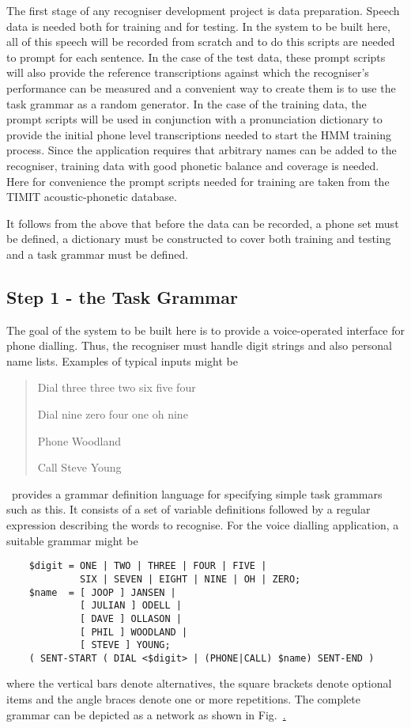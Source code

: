 The first stage of any recogniser development project is data preparation.
  Speech data is needed both for training and for
testing.  In the system to be built here, all of this speech will be recorded
from scratch and to do this scripts are needed to prompt for each sentence.  In
the case of the test data, these prompt scripts will also provide the reference
transcriptions against which the recogniser's performance can be measured and a
convenient way to create them is to use the task grammar as a random generator.
In the case of the training data, the prompt scripts will be used in
conjunction with a pronunciation dictionary to provide the initial phone level
transcriptions needed to start the HMM training process.  Since the application
requires that arbitrary names can be added to the recogniser, training data
with good phonetic balance and coverage is needed.  Here for convenience the
prompt scripts needed for training are taken from the TIMIT acoustic-phonetic
database.

It follows from the above that before the data can be recorded, a phone set
must be defined, a dictionary must be constructed to cover both training and
testing and a task grammar must be defined.

\subsection{Step 1 - the Task Grammar}

The goal of the system to be built here is to provide a voice-operated
interface for phone dialling. Thus, the recogniser must handle digit strings
and also personal name lists. Examples of typical inputs might be
\begin{quote}
Dial three three two six five four

Dial nine zero four one oh nine

Phone Woodland

Call Steve Young
\end{quote}

\HTK\ provides a grammar definition language for
specifying simple task grammars such as this.  It consists
of a set of variable definitions followed by a regular 
expression describing the words to recognise.  For the
voice dialling application, a suitable grammar might be
\begin{verbatim}
    $digit = ONE | TWO | THREE | FOUR | FIVE |
             SIX | SEVEN | EIGHT | NINE | OH | ZERO;
    $name  = [ JOOP ] JANSEN |
             [ JULIAN ] ODELL |
             [ DAVE ] OLLASON |
             [ PHIL ] WOODLAND | 
             [ STEVE ] YOUNG;
    ( SENT-START ( DIAL <$digit> | (PHONE|CALL) $name) SENT-END )
\end{verbatim}
where the vertical bars denote alternatives, the square brackets denote
optional items and the angle braces denote one or more repetitions.  The
complete grammar can be depicted as a network as shown in
Fig.~\href{f:dialnet}.

